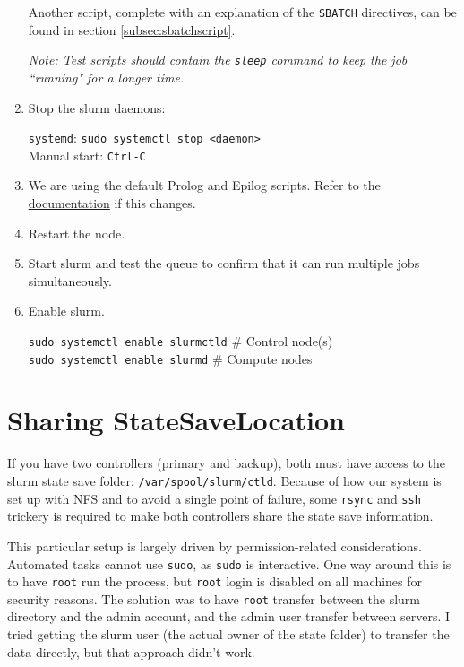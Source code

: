 \begin{enumerate}
Another script, complete with an explanation of the \texttt{SBATCH} directives, can be found in section \ref{subsec:sbatchscript}.

\emph{Note: Test scripts should contain the \emph{\texttt{sleep}} command to keep the job ``running" for a longer time.}

\item Stop the slurm daemons: 

	\texttt{systemd}: \texttt{sudo systemctl stop <daemon>} \\
	Manual start: \texttt{Ctrl-C}

\item We are using the default Prolog and Epilog scripts. Refer to the \href{https://slurm.schedmd.com/slurm.conf.html}{documentation} if this changes.

\item Restart the node.
	
\item Start slurm and test the queue to confirm that it can run multiple jobs simultaneously.

\item Enable slurm.

	\texttt{sudo systemctl enable slurmctld} \quad \# Control node(s) \\
	\texttt{sudo systemctl enable slurmd} \quad \# Compute nodes 
	
\end{enumerate}


\section{Sharing StateSaveLocation} \label{sec:shareStateSave}

If you have two controllers (primary and backup), both must have access to the slurm state save folder: \texttt{/var/spool/slurm/ctld}. Because of how our system is set up with NFS and to avoid a single point of failure, some \texttt{rsync} and \texttt{ssh} trickery is required to make both controllers share the state save information.

This particular setup is largely driven by permission-related considerations. Automated tasks cannot use \texttt{sudo}, as \texttt{sudo} is interactive. One way around this is to have \texttt{root} run the process, but \texttt{root} login is disabled on all machines for security reasons. The solution was to have \texttt{root} transfer between the slurm directory and the admin account, and the admin user transfer between servers. I tried getting the slurm user (the actual owner of the state folder) to transfer the data directly, but that approach didn't work.

